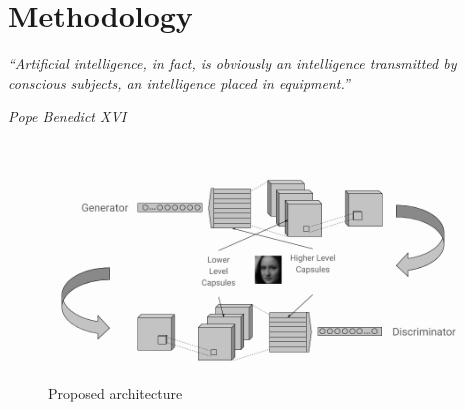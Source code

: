 \chapter{Methodology}\label{ch:methodology}
\epigraph{\textit{\Large “Artificial intelligence, in fact, is obviously an intelligence transmitted by conscious subjects, an intelligence placed in equipment.”}}{\textit{ \large Pope Benedict XVI}}
\begin{figure}[H]
\centering\includegraphics[width=1\textwidth]{images/methodology.png}
\caption{Proposed architecture}
\end{figure}